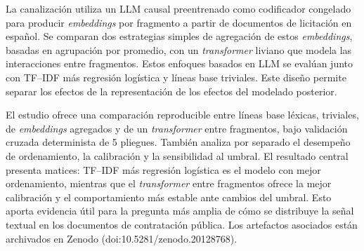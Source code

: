 La canalización utiliza un LLM causal preentrenado como codificador congelado para producir \textit{embeddings} por fragmento a partir de documentos de licitación en español. Se comparan dos estrategias simples de agregación de estos \textit{embeddings}, basadas en agrupación por promedio, con un \textit{transformer} liviano que modela las interacciones entre fragmentos. Estos enfoques basados en LLM se evalúan junto con TF--IDF más regresión logística y líneas base triviales. Este diseño permite separar los efectos de la representación de los efectos del modelado posterior.

El estudio ofrece una comparación reproducible entre líneas base léxicas, triviales, de \textit{embeddings} agregados y de un \textit{transformer} entre fragmentos, bajo validación cruzada determinista de 5 pliegues. También analiza por separado el desempeño de ordenamiento, la calibración y la sensibilidad al umbral. El resultado central presenta matices: TF--IDF más regresión logística es el modelo con mejor ordenamiento, mientras que el \textit{transformer} entre fragmentos ofrece la mejor calibración y el comportamiento más estable ante cambios del umbral. Esto aporta evidencia útil para la pregunta más amplia de cómo se distribuye la señal textual en los documentos de contratación pública. Los artefactos asociados están archivados en Zenodo (doi:10.5281/zenodo.20128768).
